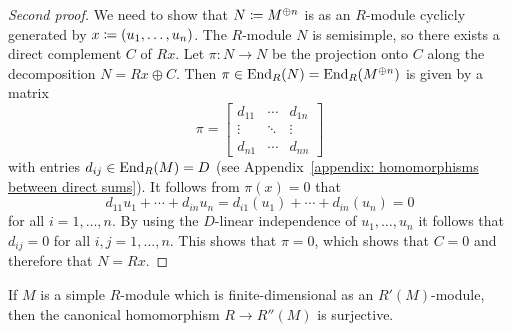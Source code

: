 \begin{proof}[Second proof]
  We need to show that $N \coloneqq M^{\oplus n}$ is as an $R$-module cyclicly generated by $x \coloneqq (u_1, \dotsc, u_n)$.
  The $R$-module $N$ is semisimple, so there exists a direct complement $C$ of $Rx$.
  Let $\pi \colon N \to N$ be the projection onto $C$ along the decomposition $N = Rx \oplus C$.
  Then $\pi \in \operatorname{End}_R(N) = \operatorname{End}_R(M^{\oplus n})$ is given by a matrix
  \[
      \pi
    = \begin{bmatrix}
        d_{11}  & \cdots  & d_{1n}  \\
        \vdots  & \ddots  & \vdots  \\
        d_{n1}  & \cdots  & d_{nn}
      \end{bmatrix}
  \]
  with entries $d_{ij} \in \operatorname{End}_R(M) = D$ (see Appendix~\ref{appendix: homomorphisms between direct sums}).
  It follows from $\pi(x) = 0$ that
  \[
      d_{11} u_1 + \dotsb + d_{in} u_n
    = d_{i1}(u_1) + \dotsb + d_{in}(u_n)
    = 0
  \]
  for all $i = 1, \dotsc, n$.
  By using the $D$-linear independence of $u_1, \dotsc, u_n$ it follows that $d_{ij} = 0$ for all $i, j = 1, \dotsc, n$.
  This shows that $\pi = 0$, which shows that $C = 0$ and therefore that $N = Rx$.
\end{proof}


\begin{corollary}
  If $M$ is a simple $R$-module which is finite-dimensional as an $R'(M)$-module, then the canonical homomorphism $R \to R''(M)$ is surjective.
\end{corollary}





